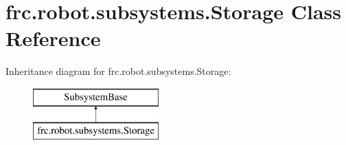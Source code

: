\hypertarget{classfrc_1_1robot_1_1subsystems_1_1_storage}{}\section{frc.\+robot.\+subsystems.\+Storage Class Reference}
\label{classfrc_1_1robot_1_1subsystems_1_1_storage}
Inheritance diagram for frc.\+robot.\+subsystems.\+Storage\+:\begin{figure}[H]
\begin{center}
\leavevmode
\includegraphics[height=2.000000cm]{classfrc_1_1robot_1_1subsystems_1_1_storage}
\end{center}
\end{figure}
